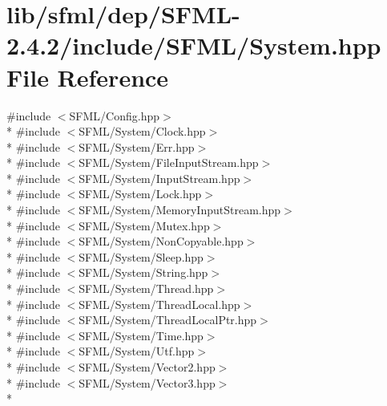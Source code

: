\hypertarget{sfml_2dep_2_s_f_m_l-2_84_82_2include_2_s_f_m_l_2_system_8hpp}{\section{lib/sfml/dep/\-S\-F\-M\-L-\/2.4.2/include/\-S\-F\-M\-L/\-System.hpp File Reference}
\label{sfml_2dep_2_s_f_m_l-2_84_82_2include_2_s_f_m_l_2_system_8hpp}
}
{\ttfamily \#include $<$S\-F\-M\-L/\-Config.\-hpp$>$}\\*
{\ttfamily \#include $<$S\-F\-M\-L/\-System/\-Clock.\-hpp$>$}\\*
{\ttfamily \#include $<$S\-F\-M\-L/\-System/\-Err.\-hpp$>$}\\*
{\ttfamily \#include $<$S\-F\-M\-L/\-System/\-File\-Input\-Stream.\-hpp$>$}\\*
{\ttfamily \#include $<$S\-F\-M\-L/\-System/\-Input\-Stream.\-hpp$>$}\\*
{\ttfamily \#include $<$S\-F\-M\-L/\-System/\-Lock.\-hpp$>$}\\*
{\ttfamily \#include $<$S\-F\-M\-L/\-System/\-Memory\-Input\-Stream.\-hpp$>$}\\*
{\ttfamily \#include $<$S\-F\-M\-L/\-System/\-Mutex.\-hpp$>$}\\*
{\ttfamily \#include $<$S\-F\-M\-L/\-System/\-Non\-Copyable.\-hpp$>$}\\*
{\ttfamily \#include $<$S\-F\-M\-L/\-System/\-Sleep.\-hpp$>$}\\*
{\ttfamily \#include $<$S\-F\-M\-L/\-System/\-String.\-hpp$>$}\\*
{\ttfamily \#include $<$S\-F\-M\-L/\-System/\-Thread.\-hpp$>$}\\*
{\ttfamily \#include $<$S\-F\-M\-L/\-System/\-Thread\-Local.\-hpp$>$}\\*
{\ttfamily \#include $<$S\-F\-M\-L/\-System/\-Thread\-Local\-Ptr.\-hpp$>$}\\*
{\ttfamily \#include $<$S\-F\-M\-L/\-System/\-Time.\-hpp$>$}\\*
{\ttfamily \#include $<$S\-F\-M\-L/\-System/\-Utf.\-hpp$>$}\\*
{\ttfamily \#include $<$S\-F\-M\-L/\-System/\-Vector2.\-hpp$>$}\\*
{\ttfamily \#include $<$S\-F\-M\-L/\-System/\-Vector3.\-hpp$>$}\\*
